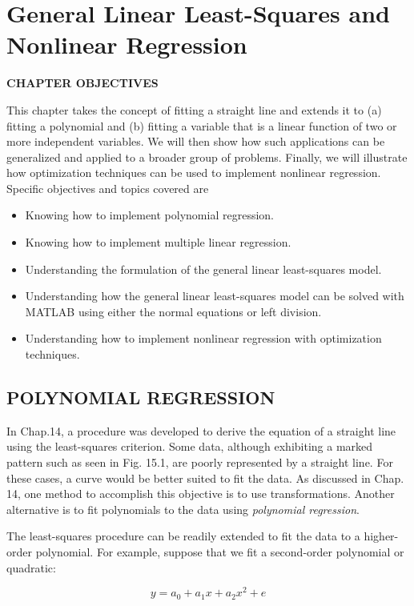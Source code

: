 \documentclass[../main.tex]{subfiles}
\begin{document}
\chapter{General Linear Least-Squares and Nonlinear Regression}
\textbf{CHAPTER OBJECTIVES}

\noindent This chapter takes the concept of fitting a straight line and extends it to (a) fitting a polynomial and (b) fitting a variable that is a linear function of two or more independent variables. We will then show how such applications can be generalized and applied to a broader group of problems. Finally, we will illustrate how optimization techniques can be used to implement nonlinear regression. Specific objectives and topics covered are

\begin{itemize}
	\item Knowing how to implement polynomial regression.
	\item Knowing how to implement multiple linear regression. 
	\item Understanding the formulation of the general linear least-squares model.
	\item Understanding how the general linear least-squares model can be solved with MATLAB using either the normal equations or left division.
	\item Understanding how to implement nonlinear regression with optimization techniques.
\end{itemize}


\label{cha:cha_P_15_1}
\section{POLYNOMIAL REGRESSION}
\noindent In Chap.14, a procedure was developed to derive the equation of a straight line using the least-squares criterion. Some data, although exhibiting a marked pattern such as seen in Fig. 15.1, are poorly represented by a straight line. For these cases, a curve would be better suited to fit the data. As discussed in Chap. 14, one method to accomplish this objective is to use transformations. Another alternative is to fit polynomials to the data using \emph{polynomial regression}.

The least-squares procedure can be readily extended to fit the data to a higher-order polynomial. For example,  suppose that we fit a second-order polynomial or quadratic:

\begin{equation}
	\tag{15.1}
	y = a_0 + a_1x + a_2x^2 + e
\end{equation}
\end{document}
